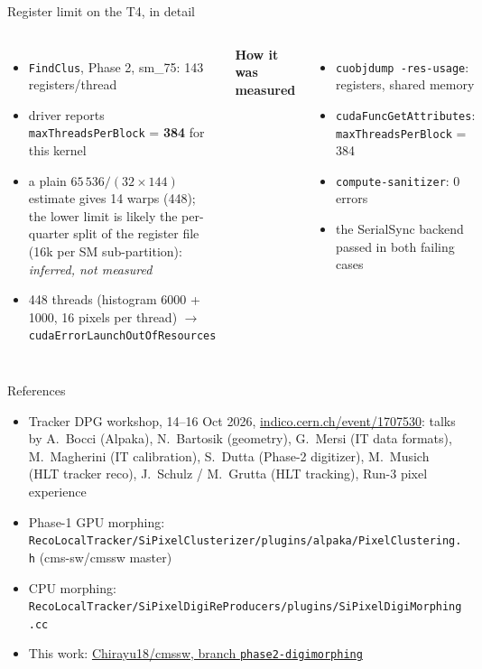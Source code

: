 \documentclass[aspectratio=169,10pt,xcolor=table]{beamer}
\newcommand{\code}[1]{\texttt{\small #1}}
\begin{document}
\begin{frame}{Register limit on the T4, in detail}
  \begin{columns}[T]
    \begin{itemize}\small
      \item \code{FindClus}, Phase 2, sm\_75: 143 registers/thread
      \item driver reports \code{maxThreadsPerBlock} = \textbf{384} for this kernel
      \item a plain $65\,536 / (32\times144)$ estimate gives 14 warps (448); the lower limit is likely the per-quarter split of the register file (16k per SM sub-partition): \textit{inferred, not measured}
      \item 448 threads (histogram 6000 + 1000, 16 pixels per thread) $\to$ \code{cudaErrorLaunchOutOfResources}
    \end{itemize}
    \textbf{How it was measured}
    \begin{itemize}\small
      \item \code{cuobjdump -res-usage}: registers, shared memory
      \item \code{cudaFuncGetAttributes}: \code{maxThreadsPerBlock} = 384
      \item \code{compute-sanitizer}: 0 errors
      \item the SerialSync backend passed in both failing cases
    \end{itemize}
  \end{columns}
\end{frame}

\begin{frame}{References}
  \small
  \begin{itemize}
    \item Tracker DPG workshop, 14--16 Oct 2026, \href{https://indico.cern.ch/event/1707530}{\color{cmsblue}indico.cern.ch/event/1707530}: talks by A.~Bocci (Alpaka), N.~Bartosik (geometry), G.~Mersi (IT data formats), M.~Magherini (IT calibration), S.~Dutta (Phase-2 digitizer), M.~Musich (HLT tracker reco), J.~Schulz / M.~Grutta (HLT tracking), Run-3 pixel experience
    \item Phase-1 GPU morphing: \code{RecoLocalTracker/SiPixelClusterizer/plugins/alpaka/PixelClustering.h} (cms-sw/cmssw master)
    \item CPU morphing: \code{RecoLocalTracker/SiPixelDigiReProducers/plugins/SiPixelDigiMorphing.cc}
    \item This work: \href{https://github.com/Chirayu18/cmssw/compare/a19318d617ffe6d96535142b12027d5d50cc08c3...phase2-digimorphing}{\color{cmsblue}Chirayu18/cmssw, branch \code{phase2-digimorphing}}
  \end{itemize}
\end{frame}
\end{document}

